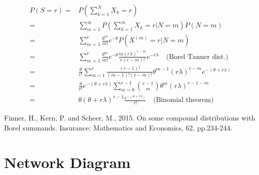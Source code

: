 \documentclass{article}
\begin{document}
\[\begin{aligned}
P(S=r) =& P\left( \sum_{k=1}^{N}  X_k=r \right)\\
=& \sum_{m=1}^{\infty} P\left(\sum_{k=1}^{m} X_k=r|N=m \right)P(N=m)\\
=& \sum_{m=1}^{r} \frac{\theta^m}{m!}e^{-\theta} P(X^{(m)} = r|N=m)\\
=& \sum_{m=1}^{r} \frac{\theta^m}{m!}e^{-\theta} \frac{m(r\lambda)^{r-m}}{r(r-m)!}e^{-r\lambda} \quad \text{(Borel Tanner dist.)}\\
=& \frac{\theta}{r!} \sum_{m=1}^{r} \frac{(r-1)!}{(m-1)!(r-m)!} \theta^{m-1}(r\lambda)^{r-m}e^{-(\theta+r\lambda)}\\
=& \frac{\theta}{r!}e^{-(\theta+r\lambda)} \sum_{m=0}^{r-1} {r-1\choose m} \theta^m (r\lambda)^{r-1-m}\\
=& \theta(\theta + r\lambda)^{r-1} \frac{e^{-(\theta+r\lambda)}}{r!} \quad \text{(Binomial theorem)}
\end{aligned}\]

Finner, H., Kern, P. and Scheer, M., 2015. On some compound distributions with Borel summands. Insurance: Mathematics and Economics, 62, pp.234-244.

  


\section{Network Diagram}
\end{document}
